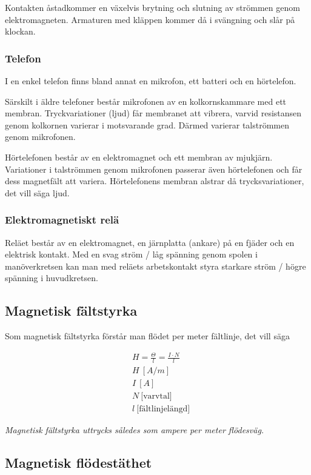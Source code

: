 \begin{multicols}{2}
Kontakten åstadkommer en växelvis brytning och slutning av strömmen genom
elektromagneten.
Armaturen med kläppen kommer då i svängning och slår på klockan.

\subsubsection{Telefon}
I en enkel telefon finns bland annat en mikrofon, ett batteri och en
hörtelefon.

Särskilt i äldre telefoner består mikrofonen av en kolkornskammare med ett
membran.
Tryckvariationer (ljud) får membranet att vibrera, varvid resistansen genom
kolkornen varierar i motsvarande grad.
Därmed varierar talströmmen genom mikrofonen.

Hörtelefonen består av en elektromagnet och ett membran av mjukjärn.
Variationer i talströmmen genom mikrofonen passerar även hörtelefonen och får dess
magnetfält att variera.
Hörtelefonens membran alstrar då trycksvariationer, det vill säga ljud.

\subsubsection{Elektromagnetiskt relä}
Reläet består av en elektromagnet, en järnplatta (ankare) på en fjäder och en
elektrisk kontakt.
Med en svag ström / låg spänning genom spolen i manöverkretsen kan man med
reläets arbetskontakt styra starkare ström / högre spänning i huvudkretsen.

\subsection{Magnetisk fältstyrka}

Som magnetisk fältstyrka förstår man flödet per meter fältlinje, det vill säga

\begin{align*}
  &H = \frac{\Theta}{l} = \frac{I \cdot N}{l} \\
  &H\ [A/m] \\
  &I\ [A] \\
  &N\ \text{[varvtal]} \\
  &l\ \text{[fältlinjelängd]}
\end{align*}

\emph{Magnetisk fältstyrka uttrycks således som ampere per meter flödesväg.}

\subsection{Magnetisk flödestäthet}


\end{multicols}
